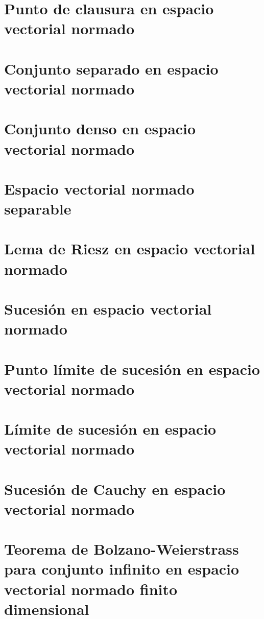 \section{Punto de clausura en espacio vectorial normado}

\section{Conjunto separado en espacio vectorial normado}

\section{Conjunto denso en espacio vectorial normado}

\section{Espacio vectorial normado separable}

\section{Lema de Riesz en espacio vectorial normado}

\section{Sucesión en espacio vectorial normado}

\section{Punto límite de sucesión en espacio vectorial normado}

\section{Límite de sucesión en espacio vectorial normado}

\section{Sucesión de Cauchy en espacio vectorial normado}

\section{Teorema de Bolzano-Weierstrass para conjunto infinito en espacio vectorial normado finito dimensional}

